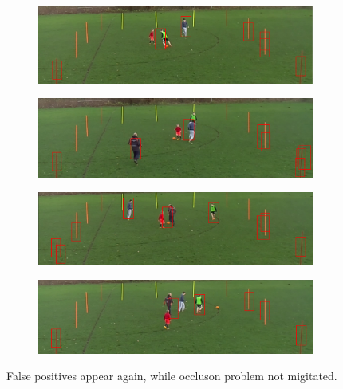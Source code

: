 \documentclass{article}
\begin{document}
\begin{figure}[h!]
  \begin{subfigure}[b]{\linewidth}
  \centering
    \includegraphics[scale=0.2]{report/pic/3/selfHOG_3rdround_1.png} 
  \end{subfigure}
  \begin{subfigure}[b]{\linewidth}
  \centering
    \includegraphics[scale=0.2]{report/pic/3/selfHOG_3rdround_2.png} 
  \end{subfigure}
  \begin{subfigure}[b]{\linewidth}
  \centering
    \includegraphics[scale=0.2]{report/pic/3/selfHOG_3rdround_3.png} 
  \end{subfigure}
  \begin{subfigure}[b]{\linewidth}
  \centering
    \includegraphics[scale=0.2]{report/pic/3/selfHOG_3rdround_4.png} 
  \end{subfigure}
  \caption{False positives appear again, while occluson problem not migitated.}
\end{figure}
\end{document}
